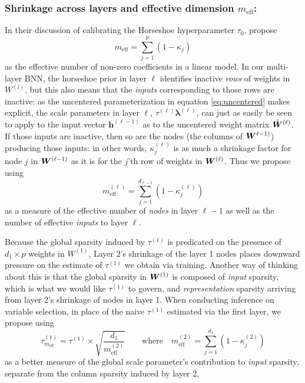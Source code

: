\subsubsection*{Shrinkage across layers and effective dimension $m_\text{eff}$:}
In their discussion of calibrating the Horseshoe hyperparameter $\tau_0$, \citet{piironen_hyperprior_2017} propose 
\begin{equation}
    m_\text{eff} = \sum_{j=1}^p (1-\kappa_j)
    \label{eq:meff}
\end{equation}
as the effective number of non-zero coefficients in a linear model.  In our multi-layer BNN, the horseshoe prior in layer $\ell$ identifies inactive \textit{rows} of weights in $W^{(l)}$, but this also means that the \textit{inputs} corresponding to those rows are inactive: as the uncentered parameterization in equation \ref{eq:uncentered} makes explicit, the scale parameters in layer $\ell$, $\tau^{(\ell)}\bm{\lambda}^{(\ell)}$, can just as easily be seen to apply to the input vector $\bm{h}^{(\ell-1)}$ as to the uncentered weight matrix $\tilde{\bm{W}}^{(\ell)}$.  If those inputs are inactive, then so are the nodes (the columns of $\bm{W}^{\ell-1)}$) producing those inputs: in other words, $\kappa^{(\ell)}_j$ is as much a shrinkage factor for node $j$ in $\bm{W}^{(\ell-1)}$ as it is for the $j$'th row of weights in $\bm{W}^{(\ell)}$. Thus we propose using 
\begin{equation}
    m^{(\ell)}_\text{eff} = \sum_{j=1}^{d_{\ell-1}} (1-\kappa^{(\ell)}_j)
    \label{eq:meff}
\end{equation}
as a measure of the effective number of \textit{nodes} in layer $\ell-1$ as well as the number of effective \textit{inputs} to layer $\ell$.  

Because the global sparsity induced by $\tau^{(1)}$ is predicated on the presence of $d_1 \times p$ weights in $W^{(1)}$, Layer 2's shrinkage of the layer 1 nodes places downward pressure on the estimate of $\tau^{(1)}$ we obtain via training.  Another way of thinking about this is that the global sparsity in $\bm{W}^{(1)}$ is composed of \textit{input} sparsity, which is what we would like $\tau^{(1)}$ to govern, and \textit{representation} sparsity arriving from layer 2's shrinkage of nodes in layer 1.  When conducting inference on variable selection, in place of the naive $\tau^{(1)}$ estimated via the first layer, we propose using 
\begin{equation}
    \tau_{m_\text{eff}}^{(1)} = \tau^{(1)} \times \sqrt{\frac{d_1}{m^{(2)}_\text{eff}}}
    \qquad \text{where} \quad m^{(2)}_\text{eff} = \sum_{j=1}^{d_1} (1-\kappa^{(2)}_j)
    \label{eq:fc2-correction}
\end{equation}
as a better measure of the global scale parameter's contribution to \textit{input} sparsity, separate from the column sparsity induced by layer 2, 

